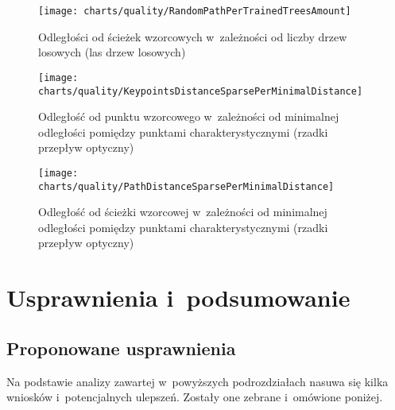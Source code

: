       \begin{figure}[!ht]
        \centering
        \texttt{[image: charts/quality/RandomPathPerTrainedTreesAmount]}
        \caption[Odległości od ścieżek wzorcowych w~zależności od liczby drzew losowych]
                {Odległości od ścieżek wzorcowych w~zależności od liczby drzew losowych (las drzew losowych)}
        \label{fig:RandomPathPerTrainedTreesAmount}
      \end{figure}


      \begin{figure}[!ht]
        \centering
        \texttt{[image: charts/quality/KeypointsDistanceSparsePerMinimalDistance]}
        \caption[Odległość od punktu wzorcowego w~zależności od minimalnej odległości pomiędzy punktami
                 charakterystycznymi]
                {Odległość od punktu wzorcowego w~zależności od minimalnej odległości pomiędzy punktami
                 charakterystycznymi (rzadki przepływ optyczny)}
        \label{fig:SpecialisedSparseKeypointsDistance}
      \end{figure}

      \begin{figure}[!ht]
        \centering
        \texttt{[image: charts/quality/PathDistanceSparsePerMinimalDistance]}
        \caption[Odległość od ścieżki wzorcowej w~zależności od minimalnej odległości pomiędzy punktami
                 charakterystycznymi]
                {Odległość od ścieżki wzorcowej w~zależności od minimalnej odległości pomiędzy punktami
                 charakterystycznymi (rzadki przepływ optyczny)}
        \label{fig:SpecialisedSparsePathDistance}
      \end{figure}

\chapter{Usprawnienia i~podsumowanie}\label{Chapter_Podsumowanie}

  \section{Proponowane usprawnienia}\label{Section_Usprawnienia}

    Na podstawie analizy zawartej w~powyższych podrozdziałach nasuwa się kilka wniosków i~potencjalnych ulepszeń. Zostały one zebrane i~omówione poniżej.

